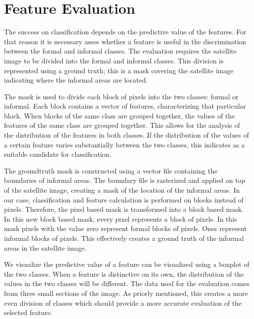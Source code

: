 
\section{Feature Evaluation}

The success on classification depends on the predictive value of the features. For that reason it is necessary asses whether a feature is useful in the discrimination between the formal and informal classes. The evaluation requires the satellite image to be divided into the formal and informal classes. This division is represented using a ground truth; this is a mask covering the satellite image indicating where the informal areas are located.

The mask is used to divide each block of pixels into the two classes: formal or
informal. Each block contains a vector of features, characterizing that particular
block. When blocks of the same class are grouped together, the values of the features
of the same class are grouped together. This allows for the analysis of the distribution of the features in both classes. If the distribution of the values of a certain feature varies substantially between the two classes, this indicates as a suitable candidate for classification.

The groundtruth mask is constructed using a vector file containing the
boundaries of informal areas. The boundary file is rasterized and applied on
top of the satellite image, creating a mask of the location of the informal
areas. In our case, classification and feature calculation is performed on
blocks instead of pixels. Therefore, the pixel based mask is transformed into a block based
mask. In this new block based mask, every pixel represents a block of pixels. In this mask pixels with the value zero represent formal blocks of pixels. Ones represent informal blocks of pixels. This effectively creates a ground truth of the informal areas in the satellite image.  

We visualize the predictive value of a feature can be visualized using a boxplot of the two
classes. When a feature is distinctive on its own, the distribution of the values in the two classes will be different. The data used for the evaluation comes from three small sections of the image. As priorly mentioned, this creates a more even division of classes which should provide a more accurate
evaluation of the selected feature.

